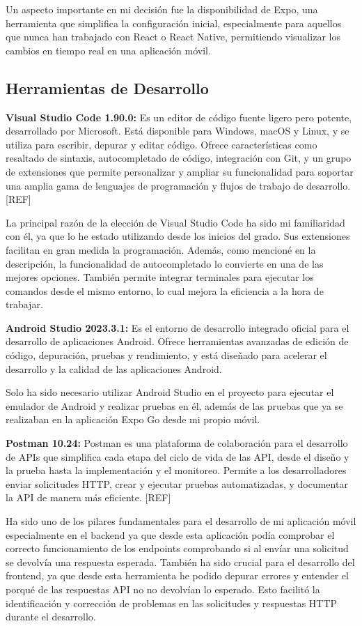 Un aspecto importante en mi decisión fue la disponibilidad de Expo, una herramienta que simplifica la configuración inicial, especialmente para aquellos que nunca han trabajado con React o React Native, permitiendo visualizar los cambios en tiempo real en una aplicación móvil.

\subsection{Herramientas de Desarrollo}

\textbf{Visual Studio Code 1.90.0:} Es un editor de código fuente ligero pero potente, desarrollado por Microsoft. Está disponible para Windows, macOS y Linux, y se utiliza para escribir, depurar y editar código. Ofrece características como resaltado de sintaxis, autocompletado de código, integración con Git, y un grupo de extensiones que permite personalizar y ampliar su funcionalidad para soportar una amplia gama de lenguajes de programación y flujos de trabajo de desarrollo. [REF]

La principal razón de la elección de Visual Studio Code ha sido mi familiaridad con él, ya que lo he estado utilizando desde los inicios del grado. Sus extensiones facilitan en gran medida la programación. Además, como mencioné en la descripción, la funcionalidad de autocompletado lo convierte en una de las mejores opciones. También permite integrar terminales para ejecutar los comandos desde el mismo entorno, lo cual mejora la eficiencia a la hora de trabajar.

\textbf{Android Studio 2023.3.1:} Es el entorno de desarrollo integrado oficial para el desarrollo de aplicaciones Android. Ofrece herramientas avanzadas de edición de código, depuración, pruebas y rendimiento, y está diseñado para acelerar el desarrollo y la calidad de las aplicaciones Android.

Solo ha sido necesario utilizar Android Studio en el proyecto para ejecutar el emulador de Android y realizar pruebas en él, además de las pruebas que ya se realizaban en la aplicación Expo Go desde mi propio móvil.

\textbf{Postman 10.24:}  Postman es una plataforma de colaboración para el desarrollo de APIs que simplifica cada etapa del ciclo de vida de las API, desde el diseño y la prueba hasta la implementación y el monitoreo. Permite a los desarrolladores enviar solicitudes HTTP, crear y ejecutar pruebas automatizadas, y documentar la API de manera más eficiente. [REF]

Ha sido uno de los pilares fundamentales para el desarrollo de mi aplicación móvil especialmente en el backend ya que desde esta aplicación podía comprobar el correcto funcionamiento de los endpoints comprobando si al envíar una solicitud se devolvía una respuesta esperada. También ha sido crucial para el desarrollo del frontend, ya que desde esta herramienta he podido depurar errores y entender el porqué de las respuestas API no no devolvían lo esperado. Esto facilitó la identificación y corrección de problemas en las solicitudes y respuestas HTTP durante el desarrollo.

